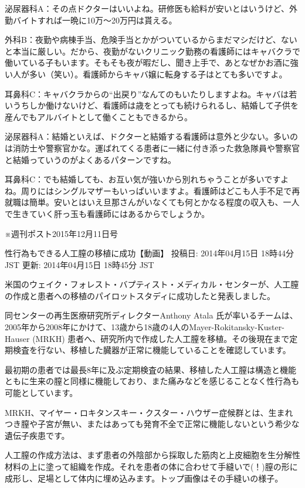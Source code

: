 泌尿器科A：その点ドクターはいいよね。研修医も給料が安いとはいうけど、外勤バイトすれば一晩に10万～20万円は貰える。

外科B：夜勤や病棟手当、危険手当とかがついているからまだマシだけど、ないと本当に厳しい。だから、夜勤がないクリニック勤務の看護師にはキャバクラで働いている子もいます。そもそも夜が暇だし、聞き上手で、あとなぜかお酒に強い人が多い（笑い）。看護師からキャバ嬢に転身する子はとても多いですよ。

耳鼻科C：キャバクラからの“出戻り”なんてのもいたりしますよね。キャバは若いうちしか働けないけど、看護師は歳をとっても続けられるし、結婚して子供を産んでもアルバイトとして働くこともできるから。

泌尿器科A：結婚といえば、ドクターと結婚する看護師は意外と少ない。多いのは消防士や警察官かな。運ばれてくる患者に一緒に付き添った救急隊員や警察官と結婚っていうのがよくあるパターンですね。

耳鼻科C：でも結婚しても、お互い気が強いから別れちゃうことが多いですよね。周りにはシングルマザーもいっぱいいますよ。看護師はどこも人手不足で再就職は簡単。安いとはいえ旦那さんがいなくても何とかなる程度の収入も、一人で生きていく肝っ玉も看護師にはあるからでしょうか。

※週刊ポスト2015年12月11日号







性行為もできる人工膣の移植に成功【動画】
投稿日: 2014年04月15日 18時44分 JST 更新: 2014年04月15日 18時45分 JST



米国のウェイク・フォレスト・バプティスト・メディカル・センターが、人工膣の作成と患者への移植のパイロットスタディに成功したと発表しました。

同センターの再生医療研究所ディレクターAnthony Atala 氏が率いるチームは、2005年から2008年にかけて、13歳から18歳の4人のMayer-Rokitansky-Kuster-Hauser (MRKH) 患者へ、研究所内で作成した人工膣を移植。その後現在まで定期検査を行ない、移植した臓器が正常に機能していることを確認しています。

最初期の患者では最長8年に及ぶ定期検査の結果、移植した人工膣は構造と機能ともに生来の膣と同様に機能しており、また痛みなどを感じることなく性行為も可能としています。

MRKH、マイヤー・ロキタンスキー・クスター・ハウザー症候群とは、生まれつき膣や子宮が無い、またはあっても発育不全で正常に機能しないという希少な遺伝子疾患です。

人工膣の作成方法は、まず患者の外陰部から採取した筋肉と上皮細胞を生分解性材料の上に塗って組織を作成。それを患者の体に合わせて手縫いで(！)膣の形に成形し、足場として体内に埋め込みます。トップ画像はその手縫いの様子。

